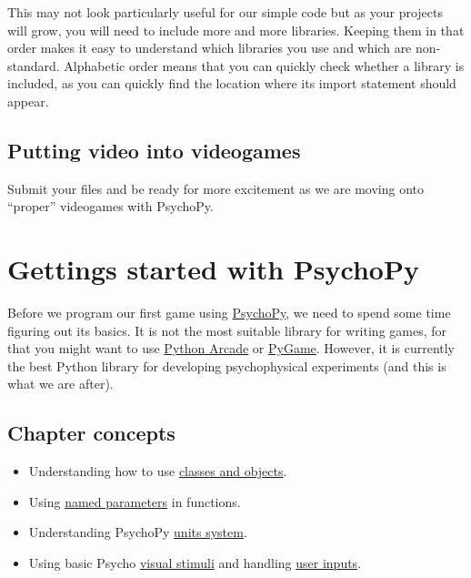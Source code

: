 \documentclass[
]{book}
\providecommand{\tightlist}{%
  \setlength{\itemsep}{0pt}\setlength{\parskip}{0pt}}
\begin{document}
This may not look particularly useful for our simple code but as your projects will grow, you will need to include more and more libraries. Keeping them in that order makes it easy to understand which libraries you use and which are non-standard. Alphabetic order means that you can quickly check whether a library is included, as you can quickly find the location where its import statement should appear.

\hypertarget{putting-video-into-videogames}{%
\section{Putting video into videogames}\label{putting-video-into-videogames}}

Submit your files and be ready for more excitement as we are moving onto ``proper'' videogames with PsychoPy.

\hypertarget{psychopy-basics}{%
\chapter{Gettings started with PsychoPy}\label{psychopy-basics}}

Before we program our first game using \href{https://psychopy.org/}{PsychoPy}, we need to spend some time figuring out its basics. It is not the most suitable library for writing games, for that you might want to use \href{https://arcade.academy/}{Python Arcade} or \href{https://www.pygame.org/}{PyGame}. However, it is currently the best Python library for developing psychophysical experiments (and this is what we are after).

\hypertarget{chapter-concepts-3}{%
\section{Chapter concepts}\label{chapter-concepts-3}}

\begin{itemize}
\tightlist
\item
  Understanding how to use \protect\hyperlink{classes-and-objects}{classes and objects}.
\item
  Using \protect\hyperlink{arguments-by-position-or-name}{named parameters} in functions.
\item
  Understanding PsychoPy \protect\hyperlink{psychopy-units}{units system}.
\item
  Using basic Psycho \protect\hyperlink{adding-text-message}{visual stimuli} and handling \protect\hyperlink{make-the-square-jump-on-your-command}{user inputs}.
\end{itemize}
\end{document}
